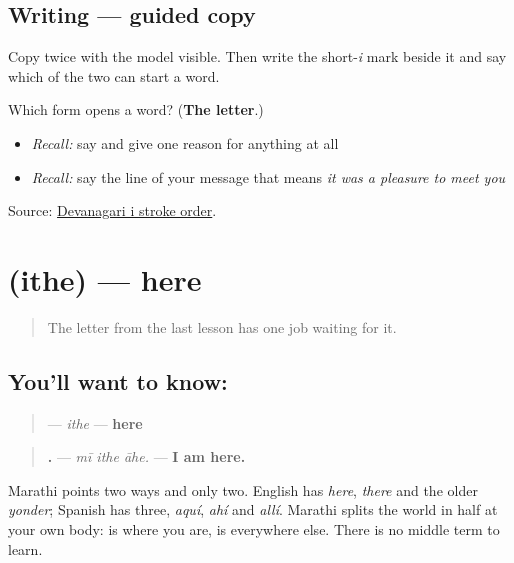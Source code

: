 \subsection*{Writing — guided copy}

Copy \textbf{} twice with the model visible. Then write the short-\emph{i} mark beside it and say which of the two can start a word.

\begin{tcolorbox}[breakable,colback=teal!4,colframe=teal!35!black,title={Before you move on}]
Which form opens a word? (\textbf{The letter}.)

\begin{itemize}
\raggedright
  \item \emph{Recall:} say \textbf{} and give one reason for anything at all
  \item \emph{Recall:} say the line of your message that means \emph{it was a pleasure to meet you}
\end{itemize}

Source: \href{https://commons.wikimedia.org/wiki/File:Devanagari\_\%E0\%A4\%87\_stroke\_order.svg}{Devanagari i stroke order}.
\end{tcolorbox}
\section[\texorpdfstring{\mr{इथे} (ithe)}{इथे (ithe)}]{ (ithe) — here}

\label{lesson:MR-C40-ithe}



\begin{quote}
The letter from the last lesson has one job waiting for it.
\end{quote}

\subsection*{You'll want to know: }
\begin{quote}
\textbf{} — \emph{ithe} — \textbf{here}
\end{quote}

\begin{quote}
\textbf{  .} — \emph{mī ithe āhe.} — \textbf{I am here.}
\end{quote}

Marathi points two ways and only two. English has \emph{here}, \emph{there} and the older \emph{yonder}; Spanish has three, \emph{aquí}, \emph{ahí} and \emph{allí}. Marathi splits the world in half at your own body: \textbf{} is where you are, \textbf{} is everywhere else. There is no middle term to learn.

